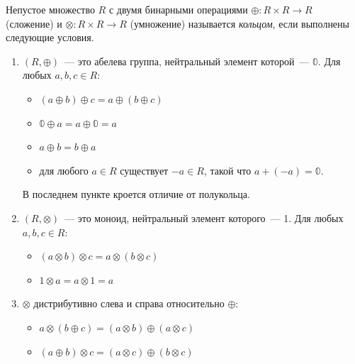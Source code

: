 \begin{definition}[Кольцо]
    Непустое множество $R$ с двумя бинарными операциями $\oplus: R \times R \to R$ (сложение) и $\otimes: R \times R \to R$ (умножение) называется \emph{кольцом}, если выполнены следующие условия.
    \begin{enumerate}
        \item $(R, \oplus)$~--- это абелева группа, нейтральный элемент которой~--- $\Bbbzero$.
              Для любых $a, b, c \in R$:
              \begin{itemize}
                  \item $(a \oplus b) \oplus c = a \oplus (b \oplus c)$
                  \item $\Bbbzero \oplus a = a \oplus \Bbbzero = a$
                  \item $a \oplus b = b \oplus a$
                  \item для любого $a \in R$ существует $-a \in  R$, такой что $a + (-a) = \Bbbzero$.
              \end{itemize}
              В последнем пункте кроется отличие от полукольца.
              \item $(R, \otimes)$~--- это моноид, нейтральный элемент которого~--- 1.
              Для любых $a, b, c \in R$:
              \begin{itemize}
                  \item $(a \otimes b) \otimes c = a \otimes (b \otimes c)$
                  \item $1 \otimes a = a \otimes 1 = a$
              \end{itemize}
        \item $\otimes$ дистрибутивно слева и справа относительно $\oplus$:
              \begin{itemize}
                  \item $a \otimes (b \oplus c) = (a \otimes b) \oplus (a \otimes c)$
                  \item $(a \oplus b) \otimes c = (a \otimes c) \oplus (b \otimes c)$
              \end{itemize}
    \end{enumerate}
\end{definition}

